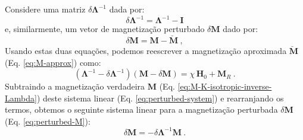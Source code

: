 Considere uma matriz $\delta \mathbf{\Lambda}^{-1}$ dada por:
\begin{equation}
\delta \mathbf{\Lambda}^{-1} = \mathbf{\Lambda}^{-1} - \mathbf{I}
\label{eq:perturbed-inverse-Lambda}
\end{equation}
e, similarmente, um vetor de magnetização perturbado $\delta \mathbf{M}$
dado por:
\begin{equation}
\delta \mathbf{M} = \mathbf{M} - \breve{\mathbf{M}} \: ,
\label{eq:perturbed-M}
\end{equation}
Usando estas duas equações, podemos reescrever a magnetização aproximada $\breve{\mathbf{M}}$ (Eq. \ref{eq:M-approx}) como:
\begin{equation}
\left( \mathbf{\Lambda}^{-1} - \delta \mathbf{\Lambda}^{-1} \right)
\left( \mathbf{M} - \delta \mathbf{M} \right) = 
\chi \, \mathbf{H}_{0} +
\mathbf{M}_{R} \: .
\label{eq:perturbed-system}
\end{equation}
Subtraindo a magnetização verdadeira 
$\mathbf{M}$ (Eq. \ref{eq:M-K-isotropic-inverse-Lambda})
deste sistema linear (Eq. \ref{eq:perturbed-system})
e rearranjando os termos, obtemos o seguinte sistema linear para a magnetização perturbada $\delta \mathbf{M}$
(Eq. \ref{eq:perturbed-M}):
\begin{equation}
\delta \mathbf{M} = - \delta \mathbf{\Lambda}^{-1} \mathbf{M} \: .
\label{eq:perturbed-M-system}
\end{equation}

